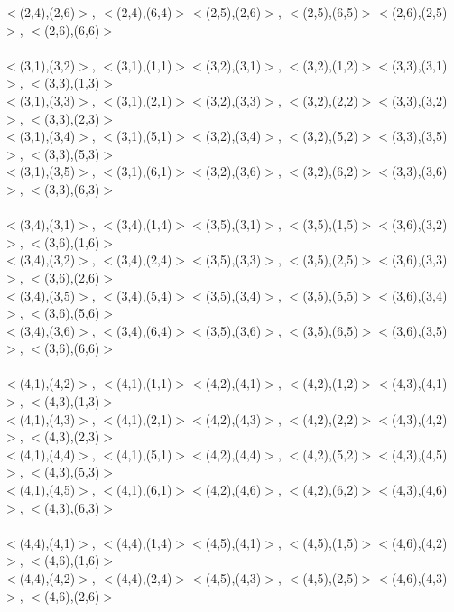 \documentclass{article}
\begin{document}
\begin{enumerate}
$<$(2,4),(2,6)$>$, $<$(2,4),(6,4)$>$\qquad	$<$(2,5),(2,6)$>$, $<$(2,5),(6,5)$>$\qquad	$<$(2,6),(2,5)$>$, $<$(2,6),(6,6)$>$\\
\\
$<$(3,1),(3,2)$>$, $<$(3,1),(1,1)$>$\qquad	$<$(3,2),(3,1)$>$, $<$(3,2),(1,2)$>$\qquad	$<$(3,3),(3,1)$>$, $<$(3,3),(1,3)$>$\\
$<$(3,1),(3,3)$>$, $<$(3,1),(2,1)$>$\qquad	$<$(3,2),(3,3)$>$, $<$(3,2),(2,2)$>$\qquad	$<$(3,3),(3,2)$>$, $<$(3,3),(2,3)$>$\\
$<$(3,1),(3,4)$>$, $<$(3,1),(5,1)$>$\qquad	$<$(3,2),(3,4)$>$, $<$(3,2),(5,2)$>$\qquad	$<$(3,3),(3,5)$>$, $<$(3,3),(5,3)$>$\\
$<$(3,1),(3,5)$>$, $<$(3,1),(6,1)$>$\qquad	$<$(3,2),(3,6)$>$, $<$(3,2),(6,2)$>$\qquad	$<$(3,3),(3,6)$>$, $<$(3,3),(6,3)$>$\\
\\
$<$(3,4),(3,1)$>$, $<$(3,4),(1,4)$>$\qquad	$<$(3,5),(3,1)$>$, $<$(3,5),(1,5)$>$\qquad	$<$(3,6),(3,2)$>$, $<$(3,6),(1,6)$>$\\
$<$(3,4),(3,2)$>$, $<$(3,4),(2,4)$>$\qquad	$<$(3,5),(3,3)$>$, $<$(3,5),(2,5)$>$\qquad	$<$(3,6),(3,3)$>$, $<$(3,6),(2,6)$>$\\
$<$(3,4),(3,5)$>$, $<$(3,4),(5,4)$>$\qquad	$<$(3,5),(3,4)$>$, $<$(3,5),(5,5)$>$\qquad	$<$(3,6),(3,4)$>$, $<$(3,6),(5,6)$>$\\
$<$(3,4),(3,6)$>$, $<$(3,4),(6,4)$>$\qquad	$<$(3,5),(3,6)$>$, $<$(3,5),(6,5)$>$\qquad	$<$(3,6),(3,5)$>$, $<$(3,6),(6,6)$>$\\
\\
$<$(4,1),(4,2)$>$, $<$(4,1),(1,1)$>$\qquad	$<$(4,2),(4,1)$>$, $<$(4,2),(1,2)$>$\qquad	$<$(4,3),(4,1)$>$, $<$(4,3),(1,3)$>$\\
$<$(4,1),(4,3)$>$, $<$(4,1),(2,1)$>$\qquad	$<$(4,2),(4,3)$>$, $<$(4,2),(2,2)$>$\qquad	$<$(4,3),(4,2)$>$, $<$(4,3),(2,3)$>$\\
$<$(4,1),(4,4)$>$, $<$(4,1),(5,1)$>$\qquad	$<$(4,2),(4,4)$>$, $<$(4,2),(5,2)$>$\qquad	$<$(4,3),(4,5)$>$, $<$(4,3),(5,3)$>$\\
$<$(4,1),(4,5)$>$, $<$(4,1),(6,1)$>$\qquad	$<$(4,2),(4,6)$>$, $<$(4,2),(6,2)$>$\qquad	$<$(4,3),(4,6)$>$, $<$(4,3),(6,3)$>$\\
\\
$<$(4,4),(4,1)$>$, $<$(4,4),(1,4)$>$\qquad	$<$(4,5),(4,1)$>$, $<$(4,5),(1,5)$>$\qquad	$<$(4,6),(4,2)$>$, $<$(4,6),(1,6)$>$\\
$<$(4,4),(4,2)$>$, $<$(4,4),(2,4)$>$\qquad	$<$(4,5),(4,3)$>$, $<$(4,5),(2,5)$>$\qquad	$<$(4,6),(4,3)$>$, $<$(4,6),(2,6)$>$\\

\end{enumerate}
\end{document}
